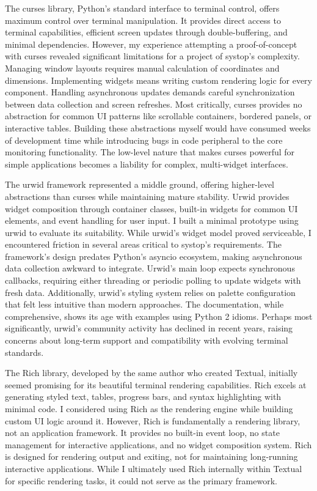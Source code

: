 \documentclass[12pt,a4paper]{article}
\begin{document}
The curses library, Python's standard interface to terminal control, offers maximum control over terminal manipulation. It provides direct access to terminal capabilities, efficient screen updates through double-buffering, and minimal dependencies. However, my experience attempting a proof-of-concept with curses revealed significant limitations for a project of systop's complexity. Managing window layouts requires manual calculation of coordinates and dimensions. Implementing widgets means writing custom rendering logic for every component. Handling asynchronous updates demands careful synchronization between data collection and screen refreshes. Most critically, curses provides no abstraction for common UI patterns like scrollable containers, bordered panels, or interactive tables. Building these abstractions myself would have consumed weeks of development time while introducing bugs in code peripheral to the core monitoring functionality. The low-level nature that makes curses powerful for simple applications becomes a liability for complex, multi-widget interfaces.

The urwid framework represented a middle ground, offering higher-level abstractions than curses while maintaining mature stability. Urwid provides widget composition through container classes, built-in widgets for common UI elements, and event handling for user input. I built a minimal prototype using urwid to evaluate its suitability. While urwid's widget model proved serviceable, I encountered friction in several areas critical to systop's requirements. The framework's design predates Python's asyncio ecosystem, making asynchronous data collection awkward to integrate. Urwid's main loop expects synchronous callbacks, requiring either threading or periodic polling to update widgets with fresh data. Additionally, urwid's styling system relies on palette configuration that felt less intuitive than modern approaches. The documentation, while comprehensive, shows its age with examples using Python 2 idioms. Perhaps most significantly, urwid's community activity has declined in recent years, raising concerns about long-term support and compatibility with evolving terminal standards.

The Rich library, developed by the same author who created Textual, initially seemed promising for its beautiful terminal rendering capabilities. Rich excels at generating styled text, tables, progress bars, and syntax highlighting with minimal code. I considered using Rich as the rendering engine while building custom UI logic around it. However, Rich is fundamentally a rendering library, not an application framework. It provides no built-in event loop, no state management for interactive applications, and no widget composition system. Rich is designed for rendering output and exiting, not for maintaining long-running interactive applications. While I ultimately used Rich internally within Textual for specific rendering tasks, it could not serve as the primary framework.
\end{document}
